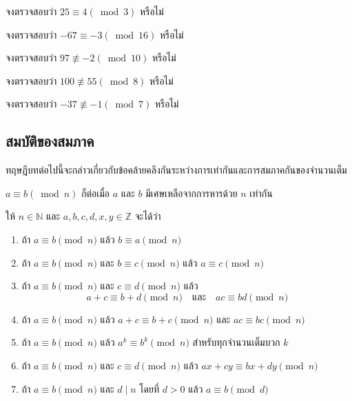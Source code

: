 \begin{examplebox}
	จงตรวจสอบว่า $25 \equiv 4(\bmod 3)$ หรือไม่
\end{examplebox}
\solution

\begin{examplebox}
	จงตรวจสอบว่า $-67 \equiv -3(\bmod 16)$ หรือไม่
\end{examplebox}
\solution

\begin{examplebox}
	จงตรวจสอบว่า $97 \not \equiv -2(\bmod 10)$ หรือไม่
\end{examplebox}
\solution


\begin{examplebox}
	จงตรวจสอบว่า  $100 \not \equiv 55(\bmod 8)$ หรือไม่
\end{examplebox}
\solution

\begin{examplebox}
จงตรวจสอบว่า  $-37 \not \equiv -1(\bmod 7)$ หรือไม่
\end{examplebox}
\solution

\newpage
\subsection{สมบัติของสมภาค}
ทฤษฎีบทต่อไปนี้จะกล่าวเกี่ยวกับข้อคล้ายคลึงกันระหว่างการเท่ากันและการสมภาคกันของจำนวนเต็ม

\begin{theorembox}
$a \equiv b(\bmod n)$ ก็ต่อเมื่อ $a$ และ $b$ มีเศษเหลือจากการหารด้วย $n$ เท่ากัน 
\end{theorembox}

\begin{theorembox}
	ให้ $n \in \mathbb{N}$ และ $a, b, c, d, x, y \in \mathbb{Z}$ จะได้ว่า
	\begin{enumerate}
		\item ถ้า $a \equiv b \pmod{n}$ แล้ว $b \equiv a \pmod{n}$
		\item ถ้า $a \equiv b \pmod{n}$ และ $b \equiv c \pmod{n}$ แล้ว $a \equiv c \pmod{n}$
		\item ถ้า $a \equiv b \pmod{n}$ และ $c \equiv d \pmod{n}$ แล้ว 
		\[ a+c \equiv b+d \pmod{n} \quad \text{และ} \quad ac \equiv bd \pmod{n} \]
		\item ถ้า $a \equiv b \pmod{n}$ แล้ว $a+c \equiv b+c \pmod{n}$ และ $ac \equiv bc \pmod{n}$
		\item ถ้า $a \equiv b \pmod{n}$ แล้ว $a^k \equiv b^k \pmod{n}$ สำหรับทุกจำนวนเต็มบวก $k$
		\item ถ้า $a \equiv b \pmod{n}$ และ $c \equiv d \pmod{n}$ แล้ว $ax+cy \equiv bx+dy \pmod{n}$
		\item ถ้า $a \equiv b \pmod{n}$ และ $d \mid n$ โดยที่ $d > 0$ แล้ว $a \equiv b \pmod{d}$
	\end{enumerate}
\end{theorembox}

